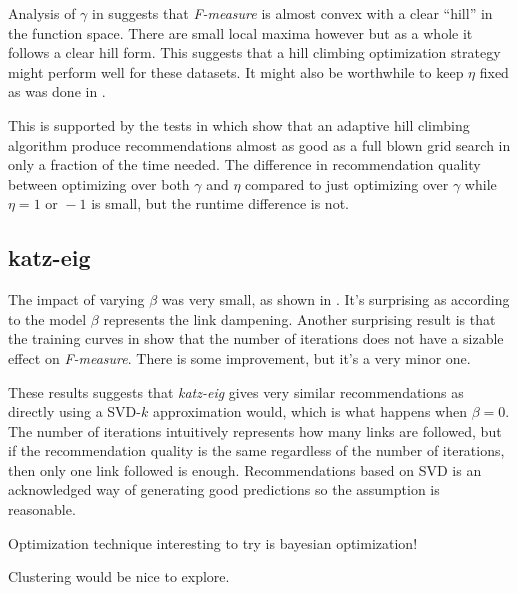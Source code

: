 Analysis of $\gamma$ in  suggests that \textit{F-measure} is almost convex with a clear ``hill'' in the function space. There are small local maxima however but as a whole it follows a clear hill form. This suggests that a hill climbing optimization strategy might perform well for these datasets. It might also be worthwhile to keep $\eta$ fixed as was done in \cite{huang2004link, huang2007comparison}.

This is supported by the tests in  which show that an adaptive hill climbing algorithm produce recommendations almost as good as a full blown grid search in only a fraction of the time needed. The difference in recommendation quality between optimizing over both $\gamma$ and $\eta$ compared to just optimizing over $\gamma$ while $\eta = 1 \text{ or } -1$ is small, but the runtime difference is not.

\subsection{katz-eig}

The impact of varying $\beta$ was very small, as shown in . It's surprising as according to the model $\beta$ represents the link dampening. Another surprising result is that the training curves in  show that the number of iterations does not have a sizable effect on \textit{F-measure}. There is some improvement, but it's a very minor one.

These results suggests that \textit{katz-eig} gives very similar recommendations as directly using a SVD-$k$ approximation would, which is what happens when $\beta = 0$. The number of iterations intuitively represents how many links are followed, but if the recommendation quality is the same regardless of the number of iterations, then only one link followed is enough. Recommendations based on SVD is an acknowledged way of generating good predictions \citep{bobadilla2013recommender} so the assumption is reasonable.



\vspace{1cm}

Optimization technique interesting to try is bayesian optimization!

Clustering would be nice to explore.

